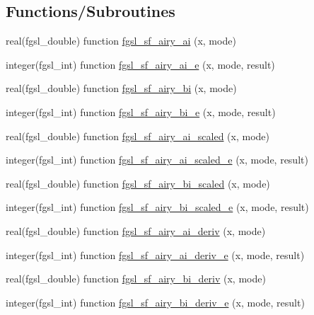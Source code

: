 \subsection*{Functions/\-Subroutines}
\begin{DoxyCompactItemize}
\item 
real(fgsl\-\_\-double) function \hyperlink{specfunc_8finc_a0a9cb6f83b4092fd74711030c2ce7a51}{fgsl\-\_\-sf\-\_\-airy\-\_\-ai} (x, mode)
\item 
integer(fgsl\-\_\-int) function \hyperlink{specfunc_8finc_aae74426785db074c7469d742379ce839}{fgsl\-\_\-sf\-\_\-airy\-\_\-ai\-\_\-e} (x, mode, result)
\item 
real(fgsl\-\_\-double) function \hyperlink{specfunc_8finc_ac8715e3bab2797eaae8b23af36409624}{fgsl\-\_\-sf\-\_\-airy\-\_\-bi} (x, mode)
\item 
integer(fgsl\-\_\-int) function \hyperlink{specfunc_8finc_a556a6d52466a83c16d32407abc301192}{fgsl\-\_\-sf\-\_\-airy\-\_\-bi\-\_\-e} (x, mode, result)
\item 
real(fgsl\-\_\-double) function \hyperlink{specfunc_8finc_a95c23bef46cbe6739e304b7c5f9c8846}{fgsl\-\_\-sf\-\_\-airy\-\_\-ai\-\_\-scaled} (x, mode)
\item 
integer(fgsl\-\_\-int) function \hyperlink{specfunc_8finc_acdf1711fdbaa7e6053fb2df543bd6a57}{fgsl\-\_\-sf\-\_\-airy\-\_\-ai\-\_\-scaled\-\_\-e} (x, mode, result)
\item 
real(fgsl\-\_\-double) function \hyperlink{specfunc_8finc_a20d61b75eb06b8f739012682165eb8ac}{fgsl\-\_\-sf\-\_\-airy\-\_\-bi\-\_\-scaled} (x, mode)
\item 
integer(fgsl\-\_\-int) function \hyperlink{specfunc_8finc_adfc309f1d316dfd0727966cd8376ecc0}{fgsl\-\_\-sf\-\_\-airy\-\_\-bi\-\_\-scaled\-\_\-e} (x, mode, result)
\item 
real(fgsl\-\_\-double) function \hyperlink{specfunc_8finc_a8cccae83c96b49f243622c2376f6c79c}{fgsl\-\_\-sf\-\_\-airy\-\_\-ai\-\_\-deriv} (x, mode)
\item 
integer(fgsl\-\_\-int) function \hyperlink{specfunc_8finc_a5a2b51dce047483401907c6f8a700a24}{fgsl\-\_\-sf\-\_\-airy\-\_\-ai\-\_\-deriv\-\_\-e} (x, mode, result)
\item 
real(fgsl\-\_\-double) function \hyperlink{specfunc_8finc_a94ab39a6b0392152feab691f5db95887}{fgsl\-\_\-sf\-\_\-airy\-\_\-bi\-\_\-deriv} (x, mode)
\item 
integer(fgsl\-\_\-int) function \hyperlink{specfunc_8finc_a9a8b6c05c9a91fdcd6606152ea3ae60e}{fgsl\-\_\-sf\-\_\-airy\-\_\-bi\-\_\-deriv\-\_\-e} (x, mode, result)

\end{DoxyCompactItemize}
